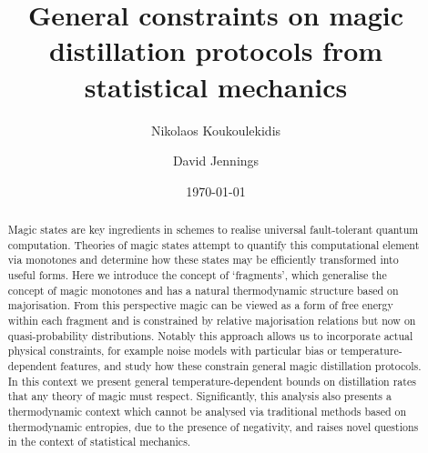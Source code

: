 \documentclass[pra,
aps,
twocolumn,
superscriptaddress,
groupedaddress,
nofootinbib,
reprint
]{revtex4-1}
\begin{document}


\begin{abstract}
\ddd{[To be sharpened]} Magic states are key ingredients in schemes to realise universal fault-tolerant quantum computation.
Theories of magic states attempt to quantify this computational element via monotones and determine how these states may be efficiently transformed into useful forms. Here we introduce the concept of `fragments', which generalise the concept of magic monotones and has a natural thermodynamic structure based on majorisation. From this perspective magic can be viewed as a form of free energy within each fragment and is constrained by relative majorisation relations but now on quasi-probability distributions. Notably this approach allows us to incorporate actual physical constraints, for example noise models with particular bias or temperature-dependent features, and study how these constrain general magic distillation protocols. In this context we present general temperature-dependent bounds on distillation rates that any theory of magic must respect. Significantly, this analysis also presents a thermodynamic context which cannot be analysed via traditional methods based on thermodynamic entropies, due to the presence of negativity, and raises novel questions in the context of statistical mechanics.
\end{abstract}


\title{General constraints on magic distillation protocols from statistical mechanics}

\author{Nikolaos Koukoulekidis}
\author{David Jennings}

\date{\today}
\maketitle

\end{document}

